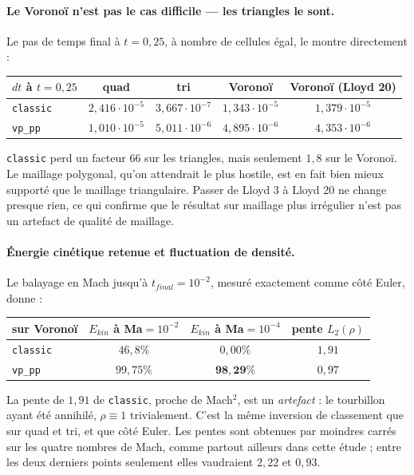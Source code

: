 \documentclass[11pt,a4paper]{article}
\begin{document}
\paragraph{Le Voronoï n'est pas le cas difficile --- les triangles le sont.}
Le pas de temps final à $t=0{,}25$, à nombre de cellules égal, le montre
directement :
\begin{table}[H]\centering
\begin{tabular}{lcccc}
\toprule
$dt$ à $t=0{,}25$ & quad & tri & Voronoï & Voronoï (Lloyd 20) \\
\midrule
\texttt{classic}   & $2{,}416\cdot10^{-5}$ & \textcolor{BrickRed}{$3{,}667\cdot10^{-7}$} & $1{,}343\cdot10^{-5}$ & $1{,}379\cdot10^{-5}$ \\
\texttt{vp\_pp} & $1{,}010\cdot10^{-5}$ & $5{,}011\cdot10^{-6}$ & $4{,}895\cdot10^{-6}$ & $4{,}353\cdot10^{-6}$ \\
\bottomrule
\end{tabular}
\end{table}
\noindent
\texttt{classic} perd un facteur $66$ sur les triangles, mais seulement $1{,}8$
sur le Voronoï. Le maillage polygonal, qu'on attendrait le plus hostile, est en
fait bien mieux supporté que le maillage triangulaire. Passer de Lloyd 3 à
Lloyd 20 ne change presque rien, ce qui confirme que le résultat sur maillage
plus irrégulier n'est pas un artefact de qualité de maillage.

\paragraph{Énergie cinétique retenue et fluctuation de densité.}
Le balayage en Mach jusqu'à $t_{final}=10^{-2}$, mesuré exactement comme côté
Euler, donne :
\begin{table}[H]\centering
\begin{tabular}{lccc}
\toprule
sur Voronoï & $E_{kin}$ à Ma$=10^{-2}$ & $E_{kin}$ à Ma$=10^{-4}$ & pente $L_2(\rho)$ \\
\midrule
\texttt{classic}   & $46{,}8\%$ & \textcolor{BrickRed}{$0{,}00\%$} & $1{,}91$ \\
\texttt{vp\_pp} & $99{,}75\%$ & $\mathbf{98{,}29\%}$ & $0{,}97$ \\
\bottomrule
\end{tabular}
\end{table}
\noindent
La pente de $1{,}91$ de \texttt{classic}, proche de Mach$^2$, est un
\emph{artefact} : le tourbillon ayant été annihilé, $\rho\equiv1$ trivialement.
C'est la même inversion de classement que sur quad et tri, et que côté Euler.
Les pentes sont obtenues par moindres carrés sur les quatre nombres de Mach,
comme partout ailleurs dans cette étude ; entre les deux derniers points
seulement elles vaudraient $2{,}22$ et $0{,}93$.
\end{document}
